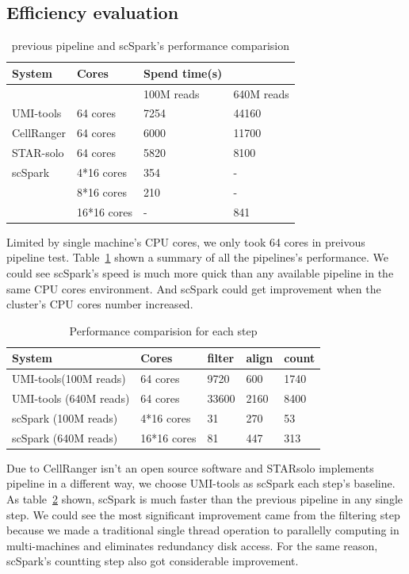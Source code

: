 \documentclass[conference]{IEEEtran}
\begin{document}
\subsection{Efficiency evaluation}
\begin{table}
  \centering
  \caption{previous pipeline and scSpark's performance comparision}\label{tab1}
  \begin{tabular}{|l | l | l  l|}
  \hline
  System &  Cores & Spend time(s) \\
  \hline
   &  & 100M reads & 640M reads \\
  \hline
  UMI-tools & 64 cores & 7254 & 44160 \\
  \hline
  CellRanger & 64 cores & 6000 & 11700 \\
  \hline
  STAR-solo & 64 cores &  5820 & 8100 \\
  \hline
  scSpark & 4*16 cores & 354 & - \\
   & 8*16 cores & 210 & - \\
   & 16*16 cores & - & 841 \\
  \hline
  \end{tabular}
\end{table}
Limited by single machine's CPU cores, we only took 64 cores in preivous pipeline test.
Table~\ref{tab1} shown a summary of all the pipelines's performance.
We could see scSpark's speed is much more quick than any available pipeline in the same CPU cores environment.
And scSpark could get improvement when the cluster's CPU cores number increased.
\begin{table}
  \centering
  \caption{Performance comparision for each step}\label{tab2}
  \begin{tabular}{|l | l | l | l | l|}
  \hline
  System & Cores & filter & align & count \\
  \hline
  UMI-tools(100M reads) & 64 cores & 9720 & 600 & 1740 \\
  \hline
  UMI-tools (640M reads) & 64 cores & 33600 & 2160 & 8400 \\
  \hline
  scSpark (100M reads) & 4*16 cores & 31 & 270 & 53 \\
  \hline
  scSpark (640M reads) & 16*16 cores & 81 & 447 & 313 \\
  \hline
  \end{tabular}
\end{table}
Due to CellRanger isn't an open source software and STARsolo implements pipeline in a different way, we choose UMI-tools as scSpark each step's baseline.
As table~\ref{tab2} shown, scSpark is much faster than the previous pipeline in any single step.
We could see the most significant improvement came from the filtering step because we made a traditional single thread operation to parallelly computing in multi-machines and eliminates redundancy disk access.
For the same reason, scSpark's countting step also got considerable improvement.
\end{document}
